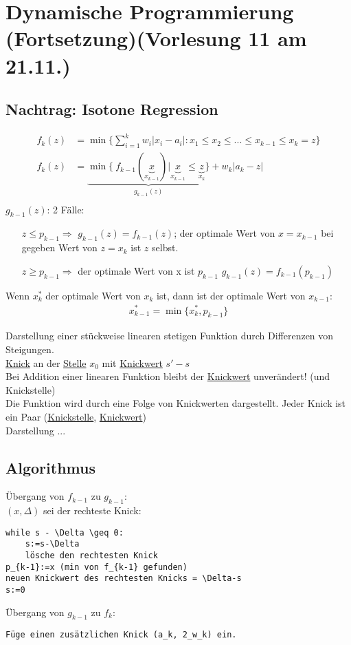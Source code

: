 \section{Dynamische Programmierung (Fortsetzung)\tiny (Vorlesung 11 am 21.11.)}
\subsection*{Nachtrag: Isotone Regression}
\begin{align*}
f_k(z) &= \min \{ \sum_{i=1}^k  w_i |x_i - a_i| : x_1 \leq x_2 \leq ... \leq x_{k-1} \leq x_k = z \}\\
f_k(z) &=  \underbrace{\min \{\ f_{k-1}(\underbrace{ x}_{x_{k-1}}) | \underbrace{ x}_{x_{k-1}} \leq \underbrace{ z}_{x_{k}} \}}_{g_{k-1}(z)} + w_k |a_k-z|\\
\end{align*}
$g_{k-1}(z)$: 2 Fälle:
\begin{enumerate}
\item[$z\leq p_{k-1} \Rightarrow$] $g_{k-1}(z)=f_{k-1}(z)$; der optimale Wert von $x=x_{k-1}$ bei gegeben Wert von $z=x_k$ ist $z$ selbst.
\item[$z\geq p_{k-1} \Rightarrow$] der optimale Wert von x ist $p_{k-1}$ 
$g_{k-1}(z) = f_{k-1}(p_{k-1})$
\end{enumerate}
Wenn $x_k^*$ der optimale Wert von $x_k$ ist, dann ist der optimale Wert von $x_{k-1}$:\\
\begin{align*}
x_{k-1}^* = \min	\{ x_k^*, p_{k-1} \}
\end{align*}

Darstellung einer stückweise linearen stetigen Funktion durch Differenzen von Steigungen.\\
\underline{Knick} an der \underline{Stelle} $x_0$ mit \underline{Knickwert} $s' - s$\\
Bei Addition einer linearen Funktion bleibt der \underline{Knickwert} unverändert! (und Knickstelle)\\

Die Funktion wird durch eine Folge von Knickwerten dargestellt. Jeder Knick ist ein Paar (\underline{Knickstelle}, \underline{Knickwert})\\
Darstellung ...
\subsection{Algorithmus}
Übergang von $f_{k-1}$ zu $g_{k-1}$:\\
$(x,\Delta)$ sei der rechteste Knick:
\begin{lstlisting}
while s - \Delta \geq 0:
	s:=s-\Delta
	lösche den rechtesten Knick
p_{k-1}:=x (min von f_{k-1} gefunden)
neuen Knickwert des rechtesten Knicks = \Delta-s
s:=0
\end{lstlisting}
Übergang von $g_{k-1}$ zu $f_k$:
\begin{lstlisting}
Füge einen zusätzlichen Knick (a_k, 2_w_k) ein.
\end{lstlisting}

